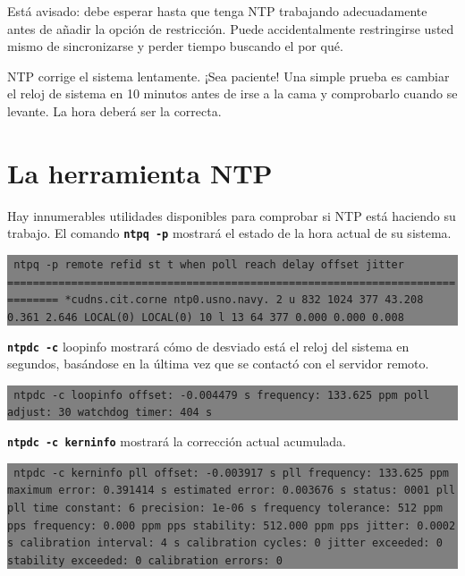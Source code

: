 \documentclass[12pt]{article}
\begin{document}
Está avisado: debe esperar hasta que tenga NTP trabajando adecuadamente 
antes de añadir la opción de restricción. Puede accidentalmente 
restringirse usted mismo de sincronizarse y perder tiempo buscando el por qué.



NTP corrige el sistema lentamente. ¡Sea paciente! Una simple prueba es
cambiar el reloj de sistema en 10 minutos antes de irse a la cama y
comprobarlo cuando se levante. La hora deberá ser la correcta.

\section*{ La herramienta NTP}


Hay innumerables utilidades disponibles para comprobar si NTP está 
haciendo su trabajo. El comando \texttt{\textbf{ntpq -p}} mostrará el estado de la hora
actual de su sistema.


\colorbox{grey}{\parbox[t]{0.95\linewidth}{ \vspace*{0.5cm} {\tt      
ntpq -p
remote           refid      st t when poll reach   delay   offset  jitter
==============================================================================
*cudns.cit.corne ntp0.usno.navy.  2 u  832 1024  377   43.208    0.361   2.646
 LOCAL(0)        LOCAL(0)        10 l   13   64  377    0.000    0.000   0.008
 } \vspace*{0.5cm} } } 

	
\texttt{\textbf{ntpdc -c}} loopinfo mostrará cómo de desviado está el reloj del sistema
en segundos, basándose en la última vez que se contactó con el servidor 
remoto.



\colorbox{grey}{\parbox[t]{0.95\linewidth}{ \vspace*{0.5cm} {\tt 
ntpdc -c loopinfo
offset:               -0.004479 s
frequency:            133.625 ppm
poll adjust:          30
watchdog timer:       404 s
 } \vspace*{0.5cm} } } 

	
\texttt{\textbf{ntpdc -c kerninfo}}  mostrará la corrección actual acumulada.


\colorbox{grey}{\parbox[t]{0.95\linewidth}{ \vspace*{0.5cm} {\tt 
ntpdc -c kerninfo
pll offset:           -0.003917 s
pll frequency:        133.625 ppm
maximum error:        0.391414 s
estimated error:      0.003676 s
status:               0001  pll
pll time constant:    6
precision:            1e-06 s
frequency tolerance:  512 ppm
pps frequency:        0.000 ppm
pps stability:        512.000 ppm
pps jitter:           0.0002 s
calibration interval: 4 s
calibration cycles:   0
jitter exceeded:      0
stability exceeded:   0
calibration errors:   0
 } \vspace*{0.5cm} } } 
\end{document}
